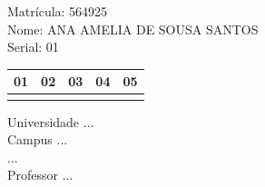 \documentclass[10pt,a4paper,twocolumn]{report}
\begin{document}
Matrícula: 564925\\ Nome: ANA AMELIA DE SOUSA SANTOS \\ Serial: 01\\
\begin{tabular}{|l|l|l|l|l|}\hline
01  &02  &03  &04  &05 \\ \hline 
 & & & & \\ \hline 
\end{tabular}
 \cleardoublepage 

\begin{flushleft}
Universidade ...\\
Campus ...\\
...\\
Professor ...\\
\end{flushleft}
\end{document}

